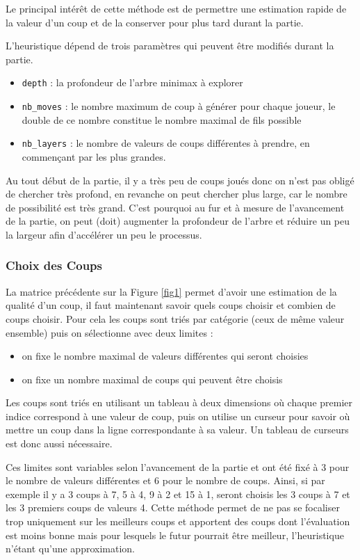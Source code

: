 \documentclass[a4paper,11pt]{article}
\begin{document}
Le principal intérêt de cette méthode est de permettre une estimation rapide de la valeur d'un coup et de la conserver pour plus tard durant la partie.

L'heuristique dépend de trois paramètres qui peuvent être modifiés durant la partie.
\begin{itemize}
    \item \verb+depth+ : la profondeur de l'arbre minimax à explorer
    \item \verb+nb_moves+ : le nombre maximum de coup à générer pour chaque joueur, le double de ce nombre constitue le nombre maximal de fils possible
    \item \verb+nb_layers+ : le nombre de valeurs de coups différentes à prendre, en commençant par les plus grandes.
\end{itemize}

Au tout début de la partie, il y a très peu de coups joués donc on n'est pas obligé de chercher très profond, en revanche on peut chercher plus large, car le nombre de possibilité est très grand. C'est pourquoi au fur et à mesure de l'avancement de la partie, on peut (doit) augmenter la profondeur de l'arbre et réduire un peu la largeur afin d'accélérer un peu le processus.

\subsubsection{Choix des Coups} \label{coups}

La matrice précédente sur la Figure \ref{fig1} permet d'avoir une estimation de la qualité d'un coup, il faut maintenant savoir quels coups choisir et combien de coups choisir. Pour cela les coups sont triés par catégorie (ceux de même valeur ensemble) puis on sélectionne avec deux limites :
\begin{itemize}
    \item on fixe le nombre maximal de valeurs différentes qui seront choisies
    \item on fixe un nombre maximal de coups qui peuvent être choisis
\end{itemize}

Les coups sont triés en utilisant un tableau à deux dimensions où chaque premier indice correspond à une valeur de coup, puis on utilise un curseur pour savoir où mettre un coup dans la ligne correspondante à sa valeur. Un tableau de curseurs est donc aussi nécessaire.

Ces limites sont variables selon l'avancement de la partie et ont été fixé à 3 pour le nombre de valeurs différentes et 6 pour le nombre de coups. Ainsi, si par exemple il y a 3 coups à 7, 5 à 4, 9 à 2 et 15 à 1, seront choisis les 3 coups à 7 et les 3 premiers coups de valeurs 4. Cette méthode permet de ne pas se focaliser trop uniquement sur les meilleurs coups et apportent des coups dont l'évaluation est moins bonne mais pour lesquels le futur pourrait être meilleur, l'heuristique n'étant qu'une approximation.
\end{document}
